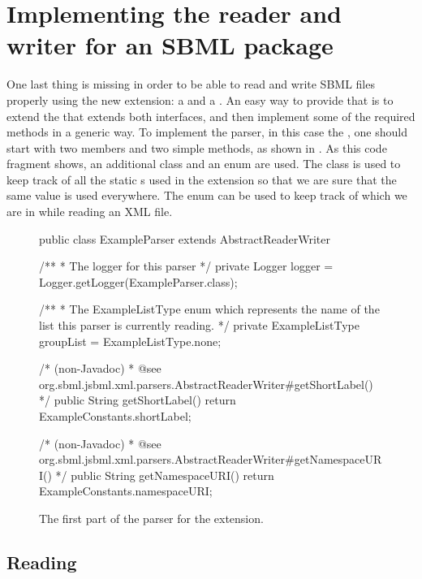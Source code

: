 
\section{Implementing the reader and writer for an SBML package}

One last thing is missing in order to be able to read and write SBML files properly
using the new extension: a  and a . An easy way to provide that is
to extend the \AbstractReaderWriter that extends both interfaces, and then implement some of 
the required methods in a generic way. To
implement the parser, in this case the , one should
start with two members and two simple methods, as shown in
. As this code fragment shows, an additional class
 and an enum  are used. The class 
is used to keep track of all the static \String{}s used in the extension so that we are sure 
that the same value is used everywhere. The enum   can be used to keep
track of which  we are in while reading an XML file.

\begin{figure}[htb]
  \begin{example}
public class ExampleParser extends AbstractReaderWriter {
  /**
   * The logger for this parser
   */
  private Logger logger = Logger.getLogger(ExampleParser.class);

  /**
   * The ExampleListType enum which represents the name of the list this parser is currently reading.
   */
  private ExampleListType groupList = ExampleListType.none;

  /* (non-Javadoc)
   * @see org.sbml.jsbml.xml.parsers.AbstractReaderWriter#getShortLabel()
   */
  public String getShortLabel() {
    return ExampleConstants.shortLabel;
  }

  /* (non-Javadoc)
   * @see org.sbml.jsbml.xml.parsers.AbstractReaderWriter#getNamespaceURI()
   */
  public String getNamespaceURI() {
    return ExampleConstants.namespaceURI;
  }
}\end{example}
 \caption{The first part of the parser for the extension.}
 \label{lst:ModelExtParserClass}
\end{figure}


\subsection{Reading}

